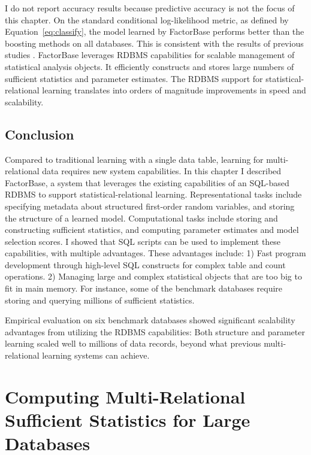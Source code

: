 \documentclass{sfuthesis}
\begin{document}
I  do not report accuracy results because predictive accuracy is not the focus of this chapter. 
On the standard conditional log-likelihood metric, as defined by Equation~\ref{eq:classify}, the model learned by FactorBase  performs better than the boosting methods on all databases. This is consistent with the results of previous studies \cite{Schulte2012}. FactorBase  leverages RDBMS capabilities for scalable management of statistical analysis objects. It efficiently constructs and stores large numbers of sufficient statistics and parameter estimates. 
The RDBMS support for statistical-relational learning translates into orders of magnitude improvements in speed and scalability.





\section{Conclusion} 
Compared to traditional learning with a single data table, learning for multi-relational data requires new system capabilities. In this chapter I  described FactorBase, a system that leverages the existing capabilities of an SQL-based RDBMS to support statistical-relational learning. Representational tasks include specifying metadata about structured first-order random variables, and storing the structure of a learned model. Computational tasks include storing and constructing sufficient statistics, and computing parameter estimates and model selection scores. 
I showed that SQL scripts can be used to implement these capabilities, with multiple advantages. These advantages include: 1) Fast program development through high-level SQL constructs for complex table and count operations. 2) Managing large and complex statistical objects that are too big to fit in main memory.  For instance, some of the benchmark databases require storing and querying millions of sufficient statistics. 

Empirical evaluation on six benchmark databases showed significant scalability advantages from utilizing the RDBMS capabilities: Both structure and parameter learning scaled well to millions of data records, beyond what previous multi-relational learning systems can achieve. 




\chapter{Computing Multi-Relational Sufficient Statistics for Large Databases}\label{cha:multiStatistic}
\end{document}
